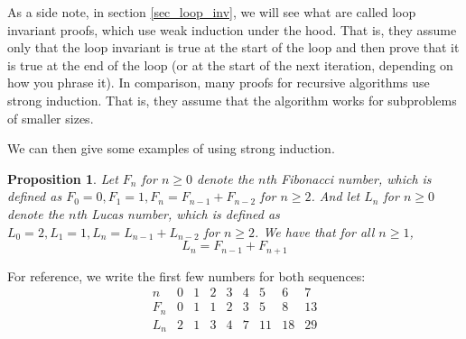 \documentclass{article}
\theoremstyle{plain}
\newtheorem{proposition}{Proposition}
\theoremstyle{definition}
\begin{document}
As a side note, in section \cref{sec_loop_inv}, we will see what are called loop invariant proofs, which use weak induction under the hood. That is, they assume only that the loop invariant is true at the start of the loop and then prove that it is true at the end of the loop (or at the start of the next iteration, depending on how you phrase it). In comparison, many proofs for recursive algorithms use strong induction. That is, they assume that the algorithm works for subproblems of smaller sizes.

We can then give some examples of using strong induction.

\begin{proposition}
    Let \(F_n\) for \(n \geq 0\) denote the \(n\)th Fibonacci number, which is defined as \(F_0 = 0, F_1 = 1, F_n = F_{n-1} + F_{n-2}\) for \(n \geq 2\). And let \(L_n\) for \(n \geq 0\) denote the \(n\)th Lucas number, which is defined as \(L_0 = 2, L_1 = 1, L_n = L_{n-1} + L_{n-2}\) for \(n \geq 2\). We have that for all \(n \geq 1\),
    \[L_n = F_{n-1} + F_{n+1}\]
\end{proposition}

For reference, we write the first few numbers for both sequences:
\[\begin{array}{c|c|c|c|c|c|c|c|c}
    n   & 0 & 1 & 2 & 3 & 4 & 5 & 6 & 7 \\
    \hline \hline
    F_n & 0 & 1 & 1 & 2 & 3 & 5 & 8 & 13 \\
    \hline
    L_n & 2 & 1 & 3 & 4 & 7 & 11 & 18 & 29 \\
\end{array}\]
\end{document}
